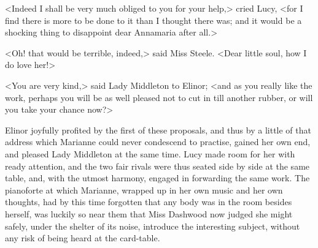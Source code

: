 <Indeed I shall be very much obliged to you for your help,> cried Lucy, <for I find there is more to be done to it than I thought there was; and it would be a shocking thing to disappoint dear Annamaria after all.>

<Oh! that would be terrible, indeed,> said Miss Steele. <Dear little soul, how I do love her!>

<You are very kind,> said Lady Middleton to Elinor; <and as you really like the work, perhaps you will be as well pleased not to cut in till another rubber, or will you take your chance now?>

Elinor joyfully profited by the first of these proposals, and thus by a little of that address which Marianne could never condescend to practise, gained her own end, and pleased Lady Middleton at the same time. Lucy made room for her with ready attention, and the two fair rivals were thus seated side by side at the same table, and, with the utmost harmony, engaged in forwarding the same work. The pianoforte at which Marianne, wrapped up in her own music and her own thoughts, had by this time forgotten that any body was in the room besides herself, was luckily so near them that Miss Dashwood now judged she might safely, under the shelter of its noise, introduce the interesting subject, without any risk of being heard at the card-table.